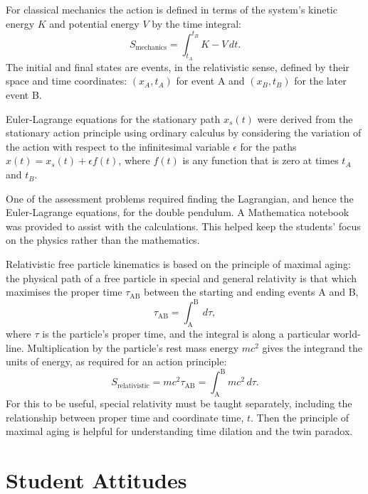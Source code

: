 \documentclass[prb,oncolumn,12pt]{revtex4-2}
\begin{document}
For classical mechanics the action is defined in terms of the system's kinetic energy $K$ and potential energy $V$ by the time integral:
%
\begin{equation} \label{action}
S_\textrm{mechanics} = \int_{t_A}^{t_B} K-V \, dt .
\end{equation}
%
The initial and final states are events, in the relativistic sense, defined by their space and time coordinates: $(x_A,t_A)$ for event A and $(x_B,t_B)$ for the later event B.

Euler-Lagrange equations for the stationary path $x_s(t)$ were derived from the stationary action principle using ordinary calculus by considering the variation of the action with respect to the infinitesimal variable $\epsilon$ for the paths $x(t) = x_s(t)+\epsilon f(t)$, where $f(t)$ is any function that is zero at times $t_A$ and $t_B$. \cite{HancAJP2004b} 

One of the assessment problems required finding the Lagrangian, and hence the Euler-Lagrange equations, for the double pendulum. A Mathematica notebook was provided to assist with the calculations. \cite{Mathematica, supplement} This helped keep the students' focus on the physics rather than the mathematics.

Relativistic free particle kinematics is based on the principle of maximal aging: \cite{TaylorandWheeler} the physical path of a free particle in special and general relativity is that which maximises the proper time $\tau_\textrm{AB}$ between the starting and ending events A and B,
%
\begin{equation} \label{maximal aging}
\tau_\textrm{AB} = \int_\textrm{A}^\textrm{B}  \, d\tau ,
\end{equation}
%
where $\tau$ is the particle's proper time, and the integral is along a particular world-line. \cite{GR} Multiplication by the particle's rest mass energy $m c^2$ gives the integrand the units of energy, as required for an action principle:
%
\begin{equation} \label{maximal aging rest mass}
S_\textrm{relativistic} = m c^2 \tau_\textrm{AB} = \int_\textrm{A}^\textrm{B} m c^2  \, d\tau .
\end{equation}
%
For this to be useful, special relativity must be taught separately, including the relationship between proper time and coordinate time, $t$. Then the principle of maximal aging is helpful for understanding time dilation and the twin paradox. \cite{Taylor2003,TaylorandWheeler}

\section{Student Attitudes}
\label{Student Attitudes}
\end{document}

